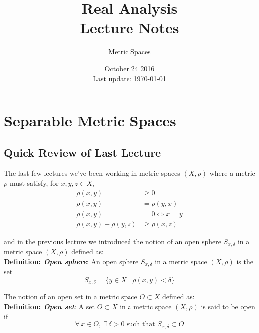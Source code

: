 \documentclass[12pt]{article}
\newlength\tindent
\renewcommand{\indent}{\hspace*{\tindent}}
\begin{document}
 
 
\title{Real Analysis\\Lecture Notes}
\author{Metric Spaces}
\date{October 24 2016 \\ Last update: \today{}}
\maketitle

\section{Separable Metric Spaces}

\subsection{Quick Review of Last Lecture}

\indent The last few lectures we've been working in metric spaces $(X, \rho)$ where a metric $\rho$ must satisfy, for $x, y, z \in X$,
\begin{align*}
	\rho(x, y) &\geq 0 \\
	\rho(x, y) &= \rho(y, x) \\
	\rho(x, y) &= 0 \iff x = y \\
	\rho(x, y) + \rho(y, z) &\geq \rho(x, z)
\end{align*}

and in the previous lecture we introduced the notion of an \underline{open sphere} $S_{x,\delta}$ in a metric space $(X,\rho)$ defined as: \\

%
%
{\bf Definition: {\em Open sphere}}: An \underline{open sphere} $S_{x,\delta}$ in a metric space $(X, \rho)$ is the set
\begin{equation*}
	S_{x,\delta} = \{ y \in X ~:~ \rho(x, y) < \delta\}
\end{equation*}

The notion of an \underline{open set} in a metric space $O \subset X$ defined as: \\

%
%
{\bf Definition: {\em Open set}}: A set $O \subset X$ in a metric space $(X, \rho)$ is said to be \underline{open} if
\begin{equation*}
	\forall\, x \in O, ~\exists\,\delta > 0 \text{ such that } S_{x,\delta} \subset O
\end{equation*}
\end{document}
